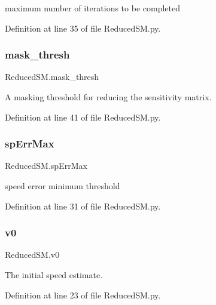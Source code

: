 maximum number of iterations to be completed 



Definition at line 35 of file Reduced\+S\+M.\+py.

\mbox{\label{namespace_reduced_s_m_a2a76625af709255ac745eda01a83142a}} 
\subsubsection{\texorpdfstring{mask\+\_\+thresh}{mask\_thresh}}
{\footnotesize\ttfamily Reduced\+S\+M.\+mask\+\_\+thresh}



A masking threshold for reducing the sensitivity matrix. 



Definition at line 41 of file Reduced\+S\+M.\+py.

\mbox{\label{namespace_reduced_s_m_a4d41ef5243c51b6b27a644ddd5984879}} 
\subsubsection{\texorpdfstring{sp\+Err\+Max}{spErrMax}}
{\footnotesize\ttfamily Reduced\+S\+M.\+sp\+Err\+Max}



speed error minimum threshold 



Definition at line 31 of file Reduced\+S\+M.\+py.

\mbox{\label{namespace_reduced_s_m_a67506428d79afaf78d10af90e7e90d3b}} 
\subsubsection{\texorpdfstring{v0}{v0}}
{\footnotesize\ttfamily Reduced\+S\+M.\+v0}



The initial speed estimate. 



Definition at line 23 of file Reduced\+S\+M.\+py.

